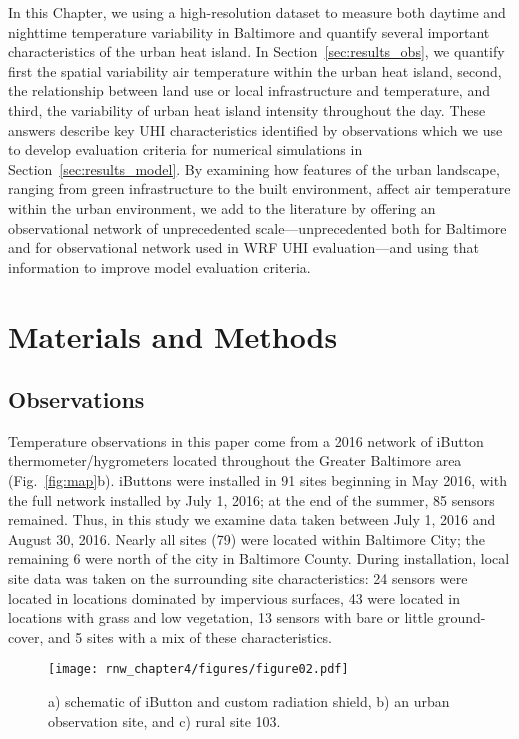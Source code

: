 In this Chapter, we using a high-resolution dataset to measure both daytime and nighttime temperature variability in Baltimore and quantify several important characteristics of the urban heat island. 
 In Section~\ref{sec:results_obs}, we quantify first the spatial variability air temperature within the urban heat island, second, the relationship between land use or local infrastructure and temperature, and third, the variability of urban heat island intensity throughout the day.
These answers describe key UHI characteristics identified by observations which we use to develop evaluation criteria for numerical simulations in Section~\ref{sec:results_model}. 
By examining how features of the urban landscape, ranging from green infrastructure to the built environment, affect air temperature within the urban environment, we add to the literature by offering an observational network of unprecedented scale---unprecedented both for Baltimore and for observational network used in WRF UHI evaluation---and using that information to improve model evaluation criteria. 



\section{Materials and Methods}\label{sec:methods}%

\subsection{Observations}
\label{sec:methods_obs}
Temperature observations in this paper come from a 2016 network of iButton thermometer/hygrometers located throughout the Greater Baltimore area (Fig.~\ref{fig:map}b). 
iButtons were installed in 91 sites beginning in May 2016, with the full network installed by July 1, 2016; at the end of the summer, 85 sensors remained. Thus, in this study we examine data taken between July 1, 2016 and August 30, 2016. Nearly all sites (79) were located within Baltimore City; the remaining 6 were north of the city in Baltimore County. During installation, local site data was taken on the surrounding site characteristics: 24 sensors were located in locations dominated by impervious surfaces, 43 were located in locations with grass and low vegetation, 13 sensors with bare or little ground-cover, and 5 sites with a mix of these characteristics. 

 \begin{figure}
\centering
\texttt{[image: rnw\_chapter4/figures/figure02.pdf]}
\caption{a) schematic of iButton and custom radiation shield, b) an urban observation site, and c) rural site 103.}
\label{fig:ibutton}
 \end{figure}

